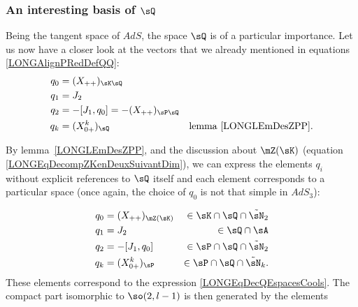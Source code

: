 %
\subsubsection{An interesting basis of \texorpdfstring{$\sQ$}{Q}}
%
\label{LONGSubSubSecInterestingBasisQ}

Being the tangent space of $AdS$, the space $\sQ$ is of a particular importance. Let us now have a closer look at the vectors that we already mentioned in equations \eqref{LONGAlignPRedDefQQ}:
\begin{subequations}				\label{LONGEqBasQQzi}
	\begin{align}
		q_0&=(X_{++})_{\sK\sQ}\\
		q_1&=J_2\\
		q_2&=-[J_1,q_0]=-(X_{++})_{\sP\sQ}\\
		q_k&=(X^k_{0+})_{\sQ}		&\text{lemma~\ref{LONGLEmDesZPP}}.
	\end{align}
\end{subequations}

By lemma~\ref{LONGLEmDesZPP}, and the discussion about $\mZ(\sK)$ (equation \eqref{LONGEqDecompZKenDeuxSuivantDim}), we can express the elements $q_i$ without explicit references to $\sQ$ itself and each element corresponds to a particular space (once again, the choice of $q_0$ is not that simple in $AdS_3$):

%
\begin{subequations}		\label{LONGEqBasQQziPlusMieux}%
	\begin{align}
		q_0&=(X_{++})_{\mZ(\sK)}&\in \sK\cap\sQ\cap\tilde\sN_2					\\
		q_1&=J_2&\in\sQ\cap\sA\\
		q_2&=-[J_1,q_0]	&\in\sP\cap\sQ\cap\tilde\sN_2	\label{LONGsubEqJUnQZQDeux}		\\
		q_k&=(X^k_{0+})_{\sP}&\in\sP\cap\sQ\cap\tilde\sN_k.
	\end{align}
\end{subequations}
These elements correspond to the expression \eqref{LONGEqDecQEspacesCools}.
%
The compact part isomorphic to $\so(2,l-1)$ is then generated by the elements%

